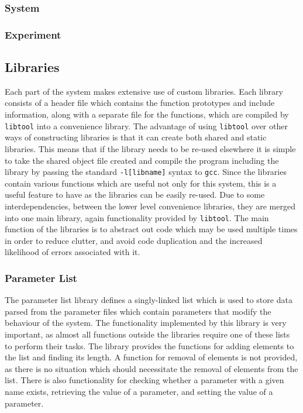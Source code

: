 \documentclass[a4paper,11pt]{article}
\begin{document}
\subsubsection{System}
\label{sec-3-3-1}
\subsubsection{Experiment}
\label{sec-3-3-2}
\subsection{Libraries}
\label{sec-3-4}

Each part of the system makes extensive use of custom libraries. Each library
consists of a header file which contains the function prototypes and include
information, along with a separate file for the functions, which are compiled by
\texttt{libtool} into a convenience library. The advantage of using
\texttt{libtool} over other ways of constructing libraries is that it can create
both shared and static libraries. This means that if the library needs to be
re-used elsewhere it is simple to take the shared object file created and
compile the program including the library by passing the standard
\texttt{-l[libname]} syntax to \texttt{gcc}. Since the libraries contain various
functions which are useful not only for this system, this is a useful feature to
have as the libraries can be easily re-used. Due to some interdependencies,
between the lower level convenience libraries, they are merged into one main
library, again functionality provided by \texttt{libtool}. The main function of
the libraries is to abstract out code which may be used multiple times in order
to reduce clutter, and avoid code duplication and the increased likelihood of
errors associated with it. 
\subsubsection{Parameter List}
\label{sec-3-4-1}

    The parameter list library defines a singly-linked list which is used to
    store data parsed from the parameter files which contain parameters that
    modify the behaviour of the system. The functionality implemented by this
    library is very important, as almost all functions outside the libraries
    require one of these lists to perform their tasks. The library provides the
    functions for adding elements to the list and finding its length. A function
    for removal of elements is not provided, as there is no situation which
    should necessitate the removal of elements from the list. There is also
    functionality for checking whether a parameter with a given name exists,
    retrieving the value of a parameter, and setting the value of a parameter.
\end{document}
